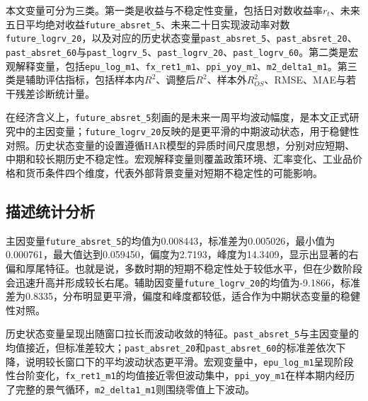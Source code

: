 本文变量可分为三类。第一类是收益与不稳定性变量，包括日对数收益率\(r_t\)、未来五日平均绝对收益\texttt{future\_absret\_5}、未来二十日实现波动率对数\texttt{future\_logrv\_20}，以及对应的历史状态变量\texttt{past\_absret\_5}、\texttt{past\_absret\_20}、\texttt{past\_absret\_60}与\texttt{past\_logrv\_5}、\texttt{past\_logrv\_20}、\texttt{past\_logrv\_60}。第二类是宏观解释变量，包括\texttt{epu\_log\_m1}、\texttt{fx\_ret1\_m1}、\texttt{ppi\_yoy\_m1}、\texttt{m2\_delta1\_m1}。第三类是辅助评估指标，包括样本内\(R^2\)、调整后\(R^2\)、样本外\(R^2_{OS}\)、RMSE、MAE与若干残差诊断统计量。

在经济含义上，\texttt{future\_absret\_5}刻画的是未来一周平均波动幅度，是本文正式研究中的主因变量；\texttt{future\_logrv\_20}反映的是更平滑的中期波动状态，用于稳健性对照。历史状态变量的设置遵循HAR模型的异质时间尺度思想，分别对应短期、中期和较长期历史不稳定性。宏观解释变量则覆盖政策环境、汇率变化、工业品价格和货币条件四个维度，代表外部背景变量对短期不稳定性的可能影响。

\subsection{描述统计分析}

主因变量\texttt{future\_absret\_5}的均值为0.008443，标准差为0.005026，最小值为0.000761，最大值达到0.059450，偏度为2.7193，峰度为14.3409，显示出显著的右偏和厚尾特征。也就是说，多数时期的短期不稳定性处于较低水平，但在少数阶段会迅速升高并形成较长右尾。辅助因变量\texttt{future\_logrv\_20}的均值为-9.1866，标准差为0.8335，分布明显更平滑，偏度和峰度都较低，适合作为中期状态变量的稳健性对照。

历史状态变量呈现出随窗口拉长而波动收敛的特征。\texttt{past\_absret\_5}与主因变量的均值接近，但标准差较大；\texttt{past\_absret\_20}和\texttt{past\_absret\_60}的标准差依次下降，说明较长窗口下的平均波动状态更平滑。宏观变量中，\texttt{epu\_log\_m1}呈现阶段性台阶变化，\texttt{fx\_ret1\_m1}的均值接近零但波动集中，\texttt{ppi\_yoy\_m1}在样本期内经历了完整的景气循环，\texttt{m2\_delta1\_m1}则围绕零值上下波动。

